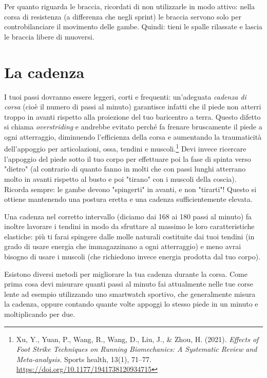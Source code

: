Per quanto riguarda le braccia,
ricordati di non utilizzarle in modo attivo:
nella corsa di resistenza (a differenza che negli sprint)
le braccia servono solo per controbilanciare il movimento delle gambe.
Quindi: tieni le spalle rilassate e lascia le braccia libere di muoversi.

\section{La cadenza}

I tuoi passi dovranno essere leggeri, corti e frequenti: un'adeguata
\emph{cadenza di corsa}
(cioè il numero di passi al minuto)
garantisce infatti che il piede non atterri troppo in avanti rispetto
alla proiezione del tuo baricentro a terra.
Questo difetto si chiama \emph{overstriding}
e andrebbe evitato perché fa frenare bruscamente il piede a ogni atterraggio,
diminuendo l'efficienza della corsa e aumentando la traumaticità
dell'appoggio per articolazioni, ossa, tendini e muscoli.\footnote{
    Xu, Y., Yuan, P., Wang, R., Wang, D., Liu, J., \& Zhou, H. (2021).
    \emph{Effects of Foot Strike Techniques on Running Biomechanics:
    A Systematic Review and Meta-analysis.}
    Sports health, 13(1), 71–77.
    \url{https://doi.org/10.1177/1941738120934715}
}
Devi invece ricercare l'appoggio del piede sotto il tuo corpo
per effettuare poi la fase di spinta verso "dietro"
(al contrario di quanto fanno in molti che con passi lunghi
atterrano molto in avanti rispetto al busto e poi "tirano"
con i muscoli della coscia).
Ricorda sempre: le gambe devono "spingerti" in avanti, e non "tirarti"! 
Questo si ottiene mantenendo una postura eretta e una cadenza sufficientemente elevata.

Una cadenza nel corretto intervallo
(diciamo dai 168 ai 180 passi al minuto)
fa inoltre lavorare i tendini in modo da sfruttare al massimo
le loro caratteristiche elastiche: più ti farai spingere
dalle molle naturali costituite dai tuoi tendini
(in grado di usare energia che immagazzinano a ogni atterraggio)
e meno avrai bisogno di usare i muscoli
(che richiedono invece energia prodotta dal tuo corpo).

Esistono diversi metodi per migliorare la tua cadenza durante la corsa.
Come prima cosa devi misurare quanti passi al minuto fai attualmente
nelle tue corse lente
ad esempio utilizzando uno smartwatch sportivo, che generalmente misura la cadenza,
oppure contando quante volte appoggi lo stesso piede in un minuto
e moltiplicando per due.

